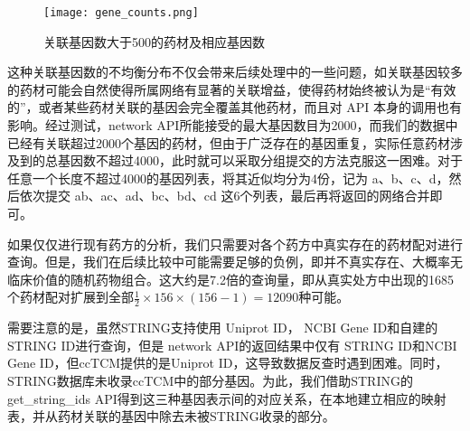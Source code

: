 \begin{figure}[H]
  \centering
  \texttt{[image: gene\_counts.png]}
  \caption{关联基因数大于500的药材及相应基因数}
  \label{fig:top_genes}
\end{figure}

这种关联基因数的不均衡分布不仅会带来后续处理中的一些问题，如关联基因较多的药材可能会自然使得所属网络有显著的关联增益，使得药材始终被认为是“有效的”，或者某些药材关联的基因会完全覆盖其他药材，而且对 API 本身的调用也有影响。经过测试，{network} API所能接受的最大基因数目为2000，而我们的数据中已经有关联超过2000个基因的药材，但由于广泛存在的基因重复，实际任意药材涉及到的总基因数不超过4000，此时就可以采取分组提交的方法克服这一困难。对于任意一个长度不超过4000的基因列表，将其近似均分为4份，记为 a、b、c、d，然后依次提交 ab、ac、ad、bc、bd、cd 这6个列表，最后再将返回的网络合并即可。

如果仅仅进行现有药方的分析，我们只需要对各个药方中真实存在的药材配对进行查询。但是，我们在后续比较中可能需要足够的负例，即并不真实存在、大概率无临床价值的随机药物组合。这大约是7.2倍的查询量，即从真实处方中出现的1685个药材配对扩展到全部$\frac{1}{2} \times 156 \times (156 - 1) = 12090$种可能。

需要注意的是，虽然STRING支持使用 Uniprot ID， NCBI Gene ID和自建的STRING ID进行查询，但是 {network} API的返回结果中仅有 STRING ID和NCBI Gene ID，但ccTCM提供的是Uniprot ID，这导致数据反查时遇到困难。同时，STRING数据库未收录ccTCM中的部分基因。为此，我们借助STRING的 {get\_string\_ids} API得到这三种基因表示间的对应关系，在本地建立相应的映射表，并从药材关联的基因中除去未被STRING收录的部分。